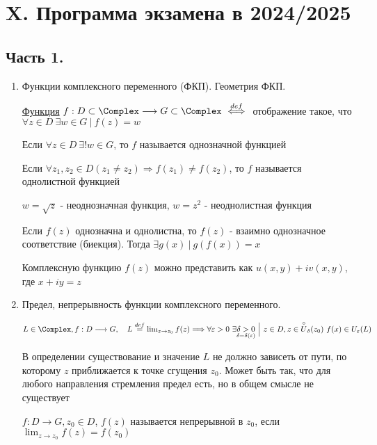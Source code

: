 \clearpage

\section{X. Программа экзамена в 2024/2025}

\subsection{Часть 1.}

\begin{enumerate}
    \item Функции комплексного переменного (ФКП). Геометрия ФКП.

    \Defs \hyperlink{complex_function}{Функция} $f : D \subset \Complex \longrightarrow G \subset \Complex \ \overset{def}{\Longleftrightarrow} \ $ отображение такое, 
    что $\forall z \in D \ \exists w \in G \ | \ f(z) = w$

    \Defs Если $\forall z \in D \ \exists! w \in G$, то $f$ называется однозначной функцией

    \Defs Если $\forall z_1, z_2 \in D (z_1 \neq z_2) \Longrightarrow f(z_1) \neq f(z_2)$, 
    то $f$ называется однолистной функцией
    
    \Exs $w = \sqrt{z}$ - неоднозначная функция, $w = z^2$ - неоднолистная функция

    \Notas Если $f(z)$ однозначна и однолистна, то $f(z)$ - взаимно однозначное соответствие (биекция). Тогда $\exists g(x) \ | \ g(f(x)) = x$
    
    Комплексную функцию $f(z)$ можно представить как $u(x, y) + i v(x, y)$, где $x + iy = z$

    \item Предел, непрерывность функции комплексного переменного.

     $L \in \Complex, f : D \longrightarrow G, \quad L \overset{def}{=} \lim_{z \to z_0} f(z) \Longrightarrow
    \forall \varepsilon > 0 \ \exists \underset{\delta = \delta(\varepsilon)}{\delta > 0} \ \Big| \ z \in D, z \in \overset{\circ}{U}_\delta(z_0) \ f(x) \in U_\varepsilon(L)$

    В определении существование и значение $L$ не должно зависеть от пути, по которому $z$ приближается к точке сгущения $z_0$.
    Может быть так, что для любого направления стремления предел есть, но в общем смысле не существует

     $f : D \longrightarrow G, z_0 \in D$, $f(z)$ называется непрерывной в $z_0$, если $\lim_{z \to z_0} f(z) = f(z_0)$


\end{enumerate}
